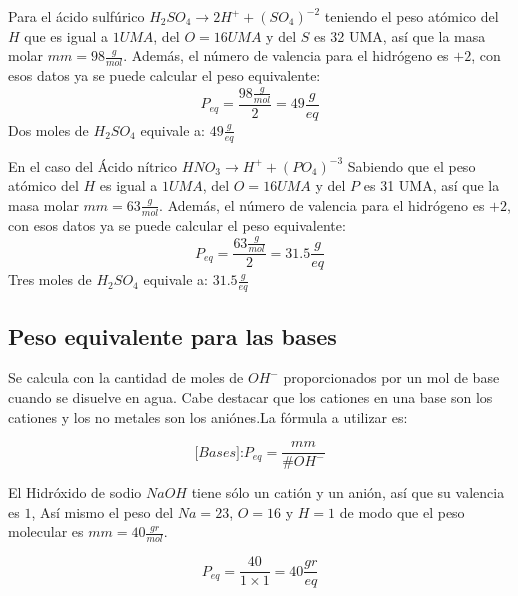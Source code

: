 \begin{example}
	Para el ácido sulfúrico $H_{2}SO_{4}\longrightarrow 2H^{+}+\left(SO_{4}\right)^{-2}$
	teniendo el peso atómico del $H$ que es igual a $1 UMA$, del $O=16UMA$ y del
	$S$ es 32 UMA, así que la masa molar $mm=98\frac{g}{mol}$.
	Además, el número de valencia para el hidrógeno es $+2$, con esos
	datos ya se puede calcular el peso equivalente:
	\begin{equation*}
		P_{eq}= \frac{98\frac{g}{mol}}{2} = 49 \frac{g}{eq}
	\end{equation*}
	Dos moles de $H_{2}SO_{4}$ equivale a: $49 \frac{g}{eq}$
\end{example}

\begin{example}
	En el caso del Ácido nítrico $HNO_{3}\longrightarrow H^{+}+\left(PO_{4}\right)^{-3}$
	Sabiendo que el peso atómico del $H$ es igual a $1 UMA$, del $O=16UMA$ y del
	$P$ es 31 UMA, así que la masa molar $mm=63\frac{g}{mol}$.
	Además, el número de valencia para el hidrógeno es $+2$, con esos
	datos ya se puede calcular el peso equivalente:
	\begin{equation*}
		P_{eq}= \frac{63\frac{g}{mol}}{2} = 31.5 \frac{g}{eq}
	\end{equation*}
	Tres moles de $H_{2}SO_{4}$ equivale a: $31.5\frac{g}{eq}$
\end{example}

\subsection{Peso equivalente para las bases}
Se calcula con la cantidad de moles de $OH^{-}$ proporcionados por un mol de base
cuando se disuelve en agua. Cabe destacar que los cationes en una base son los cationes y los no metales
son los aniónes.La fórmula a utilizar es:

\begin{equation}
	\textit{[Bases]:}P_{eq}= \frac{mm}{\# OH^{-}}
\end{equation}

\begin{example}
	El Hidróxido de sodio $NaOH$ tiene sólo un catión y un anión, así que su valencia es $1$,
	Así mismo el peso del $Na=23$, $O=16$ y $H=1$ de modo que el peso molecular es $mm=40\frac{gr}{mol}$.

	\begin{equation*}
		P_{eq}= \frac{40}{1\times 1}= 40\frac{gr}{eq}
	\end{equation*}
\end{example}

